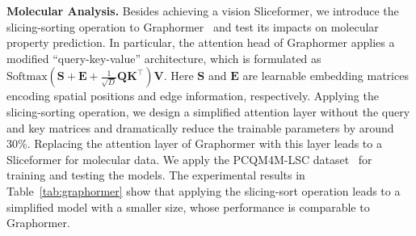 \textbf{Molecular Analysis.}
Besides achieving a vision Sliceformer, we introduce the slicing-sorting operation to Graphormer~\cite{ying2021transformers} and test its impacts on molecular property prediction. 
In particular, the attention head of Graphormer applies a modified ``query-key-value'' architecture, which is formulated as $\text{Softmax}(\bm{S}+\bm{E}+\frac{1}{\sqrt{D}}\bm{QK}^{\top})\bm{V}$. 
Here $\bm{S}$ and $\bm{E}$ are learnable embedding matrices encoding spatial positions and edge information, respectively. 
Applying the slicing-sorting operation, we design a simplified attention layer without the query and key matrices and dramatically reduce the trainable parameters by around 30\%.
Replacing the attention layer of Graphormer with this layer leads to a Sliceformer for molecular data.
We apply the PCQM4M-LSC dataset~\cite{hu2021ogb} for training and testing the models. 
The experimental results in Table~\ref{tab:graphormer} show that applying the slicing-sort operation leads to a simplified model with a smaller size, whose performance is comparable to Graphormer.